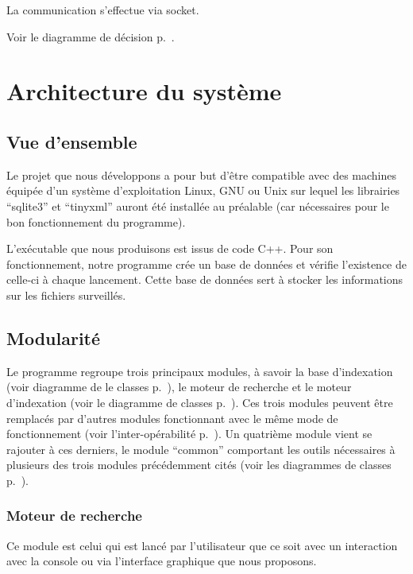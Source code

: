 \documentclass[a4paper,12pt]{report}
\begin{document}
La communication s'effectue via \gls{socket}.

Voir le diagramme de décision p.~\pageref{decision-mi}.

\chapter{Architecture du système}

\section{Vue d'ensemble}
Le projet que nous développons a pour but d'être compatible avec des machines équipée d'un système d'exploitation Linux, GNU ou Unix sur lequel les librairies \enquote{sqlite3} et \enquote{tinyxml} auront été installée au préalable (car nécessaires pour le bon fonctionnement du programme).

L'exécutable que nous produisons est issus de code C++.
Pour son fonctionnement, notre programme crée un base de données et vérifie l'existence de celle-ci à chaque lancement. Cette base de données sert à stocker les informations sur les \glspl{fichier} surveillés.

\section{Modularité}
Le programme regroupe trois principaux modules, à savoir la base d'indexation (voir diagramme de le classes p.~\pageref{diagramme_classes_bdd}), le moteur de recherche  et le moteur d'indexation (voir le diagramme de classes p.~\pageref{diagramme_classes_daemon}). Ces trois modules peuvent être remplacés par d'autres modules fonctionnant avec le même mode de fonctionnement (voir l'inter-opérabilité p.~\pageref{inter_operabilite}). Un quatrième module vient se rajouter à ces derniers, le module \enquote{common} comportant les outils nécessaires à plusieurs des trois modules précédemment cités (voir les diagrammes de classes p.~\pageref{common}).

\subsection{Moteur de recherche}
Ce module est celui qui est lancé par l'utilisateur que ce soit avec un interaction avec la \gls{console} ou via l'interface graphique que nous proposons.
\end{document}
